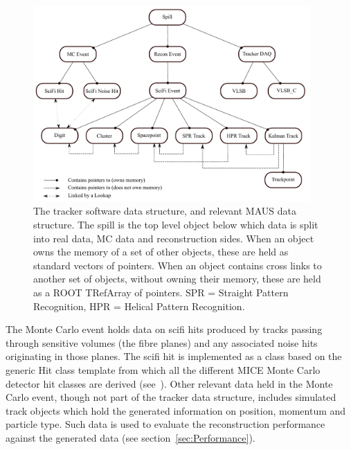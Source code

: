\begin{figure}[bt]
  \begin{center}
    \includegraphics[width=25pc]{04-DataStructure/DataStructureSimple2016.pdf}
    \caption{\label{figureDataStructure}The tracker software data structure, and relevant MAUS data structure.  The spill is the top level object below which data is split into real data, MC data and reconstruction sides. When an object owns the memory of a set of other objects, these are held as standard vectors of pointers. When an object contains cross links to another set of objects, without owning their memory, these are held as a ROOT TRefArray of pointers. SPR = Straight Pattern Recognition, HPR = Helical Pattern Recognition.}
  \end{center}
\end{figure}

The Monte Carlo event holds data on scifi hits produced by tracks passing through sensitive volumes (the fibre planes) and any associated noise hits originating in those planes. The scifi hit is implemented as a class based on the generic Hit class template from which all the different MICE Monte Carlo detector hit classes are derived (see~\cite{MausPaper}).  Other relevant data held in the Monte Carlo event, though not part of the tracker data structure, includes simulated track objects which hold the generated information on position, momentum and particle type.  Such data is used to evaluate the reconstruction performance against the generated data (see section~\ref{sec:Performance}).

